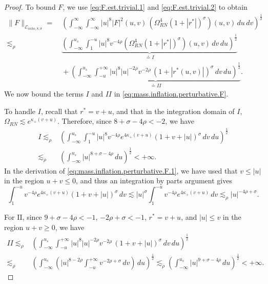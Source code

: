 \documentclass[10pt, reqno]{amsart}
\theoremstyle{definition}
\theoremstyle{remark}
\numberwithin{equation}{section}
\newcommand{\abs}[1]{\vert#1\vert}
\def\ls{\lesssim}
\newcommand{\rd}{\partial}
\newcommand{\0}{\emptyset}
\newcommand{\sgm}{\sigma}
\newcommand{\Omg}{\Omega}
\newcommand{\f}{\frac}
\begin{document}
\begin{proof}
To bound $F$, we use \eqref{eq:F.est.trivial.1} and \eqref{eq:F.est.trivial.2} to obtain
\begin{equation}\label{eq:mass.inflation.perturbative.F}
\begin{split}
\|F\|_{\mathcal E_{inho,8,\sigma}}
= &\: \left(\int_{-\infty}^{\infty}\int_{-\infty}^{\infty} |u|^8 |F|^2(u,v)\,(\Omg_{RN}^4(1+|r^*|)^\sigma)(u,v)\,du\,dv \right)^{\f 12}\\
\ls_\rho &\: \underbrace{\left(\int_{-\infty}^{u_s}\int_1^{-u} |u|^{8} v^{-4\rho}(\Omg_{RN}^4(1+|r^*|)^\sigma)(u,v)\,dv\,du \right)^{\f 12}}_{ \doteq I}\\
&\: +\underbrace{\left(\int_{-\infty}^{u_s}\int_{-u}^{+\infty} |u|^{8}|u|^{-2\rho}v^{-2\rho}\,(1+|r^*(u,v)|)^\sigma\,dv\,du \right)^{\f 12}}_{ \doteq II}.
\end{split}
\end{equation}
We now bound the terms $I$ and $II$ in \eqref{eq:mass.inflation.perturbative.F}. %

To handle $I$, recall that $r^*=v+u$, and that in the integration domain of $I$, $\Omg_{RN}\ls e^{\kappa_+ (v+u)}$.
Therefore, since $8+\sigma-4\rho<-2$, we have
\begin{equation}\label{eq:mass.inflation.perturbative.F.1}
\begin{split}
I\ls_{\rho} &\left(\int_{-\infty}^{u_s}\int_1^{-u} |u|^{8} v^{-4\rho}e^{4\kappa_+ (v+u)}(1+v+|u|)^\sigma\,dv\,du \right)^{\f 12}\\
\ls_{\rho} &\left(\int_{-\infty}^{u_s} |u|^{8+\sigma-4\rho} \,du \right)^{\f 12} < +\infty.
\end{split}
\end{equation}
In the derivation of \eqref{eq:mass.inflation.perturbative.F.1}, we have used that $v\leq |u|$ in the region $u+v\leq 0$, and thus an integration by parts argument gives
$$\int_1^{-u} v^{-4\rho}e^{4\kappa_+ (v+u)}(1+v+|u|)^\sigma\,dv \ls \abs{u}^{\sgm} \int_1^{-u} v^{-4\rho} e^{4\kappa_+ (v+u)} \,dv \ls_{\rho} |u|^{-4\rho+\sigma}.$$

For II, since $9+\sigma-4\rho<-1$, $-2\rho + \sigma <-1$,  $r^*=v+u$, and $|u|\leq v$ in the region $u+v\geq 0$, we have 
\begin{equation}\label{eq:mass.inflation.perturbative.F.2}
\begin{split}
II\ls_{\rho} & \left(\int_{-\infty}^{u_s}\int_{-u}^{+\infty} |u|^{8}|u|^{-2\rho}v^{-2\rho}\,(1+v+|u|)^\sigma\,dv\,du \right)^{\f 12}\\
\ls_{\rho}& \left(\int_{-\infty}^{u_s} (|u|^{8-2\rho} \int_{-u}^{+\infty} v^{-2\rho+\sigma} \,dv)\,du \right)^{\f 12} \ls_{\rho} \left(\int_{-\infty}^{u_s}|u|^{9+\sigma-4\rho} \,du \right)^{\f 12} < +\infty.
\end{split}
\end{equation}


\end{proof}
\end{document}
